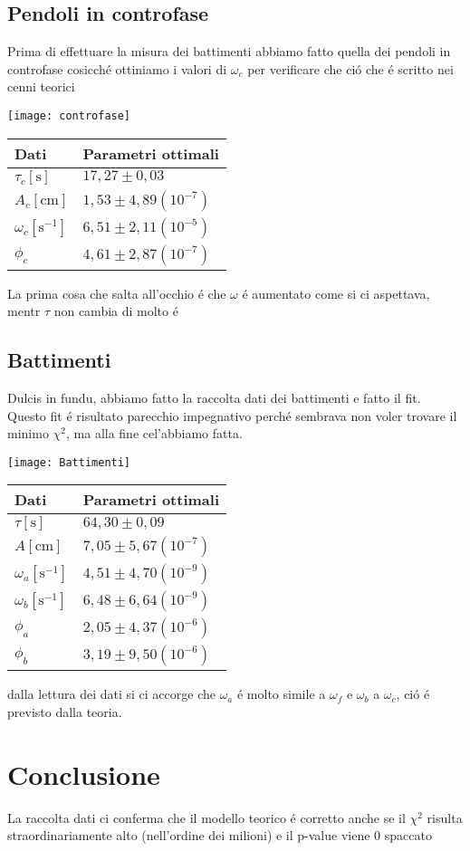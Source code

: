 \documentclass{exam}
\begin{document}
		\subsection{Pendoli in controfase}
			Prima di effettuare la misura dei battimenti abbiamo fatto quella dei pendoli in controfase cosicch\'e ottiniamo i valori di $\omega_{c}$ per verificare che ci\'o che \'e scritto nei cenni teorici\\
			\begin{minipage}{0.5\textwidth}
				\texttt{[image: controfase]}
				\end{minipage}
			\begin{minipage}{0.5\textwidth}
				\begin{tabular}{ll}
					\toprule
					Dati & Parametri ottimali \\
					\midrule
					$\tau_{c}[\textrm{s}]$ & $17,27 \pm 0,03$ \\
					$A_{c}[\textrm{cm}]$ & $1,53 \pm 4,89(10^{-7})$\\
					$\omega_{c}[{\textrm{s}^{-1}}]$ & $6,51 \pm 2,11(10^{-5})$\\			
					$\phi_{c}$ & $4,61 \pm 2,87(10^{-7})$\\
					\bottomrule
				\end{tabular}
			\end{minipage}
			La prima cosa che salta all'occhio \'e che $\omega$ \'e aumentato come si ci aspettava, mentr $\tau$ non cambia di molto \'e
		\subsection {Battimenti}
			Dulcis in fundu, abbiamo fatto la raccolta dati dei battimenti e fatto il fit. Questo fit \'e risultato parecchio impegnativo perch\'e sembrava non voler trovare il minimo $\chi^2$, ma alla fine cel'abbiamo fatta.\\
			\begin{minipage}{0.5\textwidth}
				\texttt{[image: Battimenti]}
				\end{minipage}
			\begin{minipage}{0.5\textwidth}
				\begin{tabular}{ll}
					\toprule
					Dati & Parametri ottimali \\
					\midrule
					$\tau[\textrm{s}]$ & $64,30 \pm 0,09$ \\
					$A[\textrm{cm}]$ & $7,05 \pm 5,67(10^{-7})$\\
					$\omega_{a}[\textrm{s}^{-1}]$ & $4,51 \pm 4,70(10^{-9})$\\
					$\omega_{b}[\textrm{s}^{-1}]$ & $6,48 \pm 6,64(10^{-9})$\\			
					$\phi_{a}$ & $2,05 \pm 4,37(10^{-6})$\\
					$\phi_{b}$ & $3,19 \pm 9,50(10^{-6})$\\
					\bottomrule
				\end{tabular}
			\end{minipage}
			dalla lettura dei dati si ci accorge che $\omega_{a}$ \'e molto simile a $\omega_{f}$ e $\omega_{b}$ a $\omega_{c}$, ci\'o \'e previsto dalla teoria.
	\section{Conclusione}
		La raccolta dati ci conferma che il modello teorico \'e corretto anche se il $\chi^2$ risulta straordinariamente alto (nell'ordine dei milioni) e il p-value viene 0 spaccato
\end{document}
